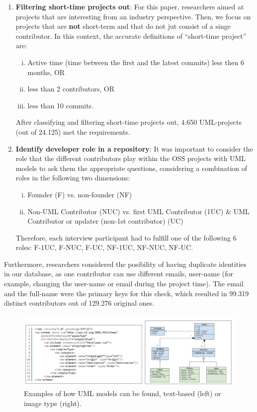 \documentclass[a4paper, 12pt]{book}
\begin{document}
\begin{enumerate}
  \item \textbf{Filtering short-time projects out}: For this paper, researchers aimed
  at projects that are interesting from an industry perspective. Then, we focus on projects that are \textbf{not} short-term and that
  do not jut consist of a singe contributor. In this context, the accurate definitions of ``short-time project'' are:
  \begin{enumerate}[i.]
    \item Active time (time between the first and the latest commits) less then 6 months, OR
    \item less than 2 contributors, OR
    \item less than 10 commits.
  \end{enumerate}
  After classifying and filtering short-time projects out, 4.650 UML-projects (out of 24.125) met the requirements.
  \item \textbf{Identify developer role in a repository}: It was important to consider the role that the different contributors
  play within the OSS projects with UML models to ask them the appropriate questions, considering a combination of roles in the
  following two dimensions:
  \begin{enumerate}[i.]
    \item Founder (F) vs. non-founder (NF)
    \item Non-UML Contributor (NUC) vs. first UML Contributor (1UC) \& UML Contributor or updater (non-1st contributor) (UC)
  \end{enumerate}
  Therefore, each interview participant had to fulfill one of the following 6 roles: F-1UC, F-NUC, F-UC, NF-1UC, NF-NUC, NF-UC.
\end{enumerate}
Furthermore, researchers considered the posibility of having duplicate identities in our database, as one contributor can
use different emails, user-name (for example, changing the user-name or email during the project time).
The email and the full-name were the primary keys for this check, which resulted in 99.319 distinct contributors out of
 129.276 original ones.
 \begin{figure}
   \centering
   \includegraphics[width=15cm, keepaspectratio]{img/umls-landscape}
   \caption{Examples of how UML models can be found, text-based (left) or image type (right).}
   \label{fig:uml-types}
 \end{figure}
\end{document}
